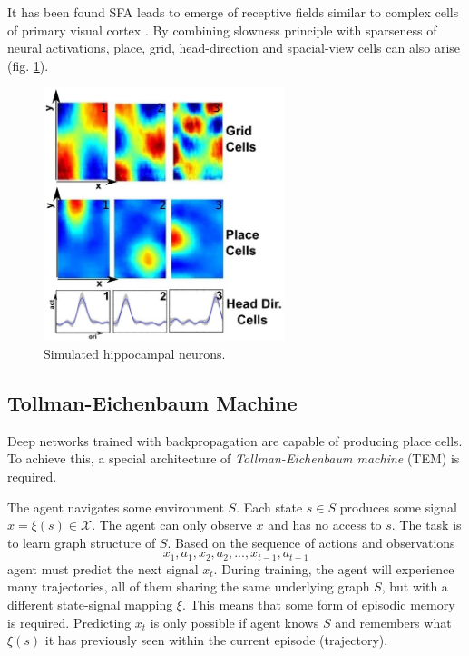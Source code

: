 \documentclass[oneside,english,logo]{amuthesis}
\begin{document}
It has been found SFA leads to emerge of receptive fields similar to complex cells of primary visual cortex \cite{sfa_complex_cells}. 
By combining slowness principle with sparseness of neural activations, place, grid, head-direction and spacial-view cells can also arise \cite{slowness_sparseness} (fig. \ref{fig:sfa_place_cells}).
\begin{figure}[!htbp]
	\centering
	\includegraphics[width=7cm]{ sfa_place_cells}
	\caption{Simulated hippocampal neurons.}
	\label{fig:sfa_place_cells}
\end{figure}

\subsection{Tollman-Eichenbaum Machine}

Deep networks trained with backpropagation are capable of producing place cells. To achieve this, a special architecture of \textit{Tollman-Eichenbaum machine} (TEM) \cite{TEM} is required. 

The agent navigates some environment $S$. Each state $s\in S$ produces some signal $x = \xi(s) \in \mathcal{X}$. The agent can only observe $x$ and has no access to $s$. The task is to learn graph structure of $S$. Based on the sequence of actions and observations 
\[
x_1, a_1, x_2, a_2, ... , x_{t-1}, a_{t-1}
\]
agent must predict the next signal $x_{t}$. During training, the agent will experience many trajectories, all of them sharing the same underlying graph $S$, but with a different state-signal mapping $\xi$. This means that some form of episodic memory is required. Predicting $x_{t}$ is only possible if agent knows $S$ and remembers what $\xi(s)$ it has previously seen within the current episode (trajectory). 
\end{document}
